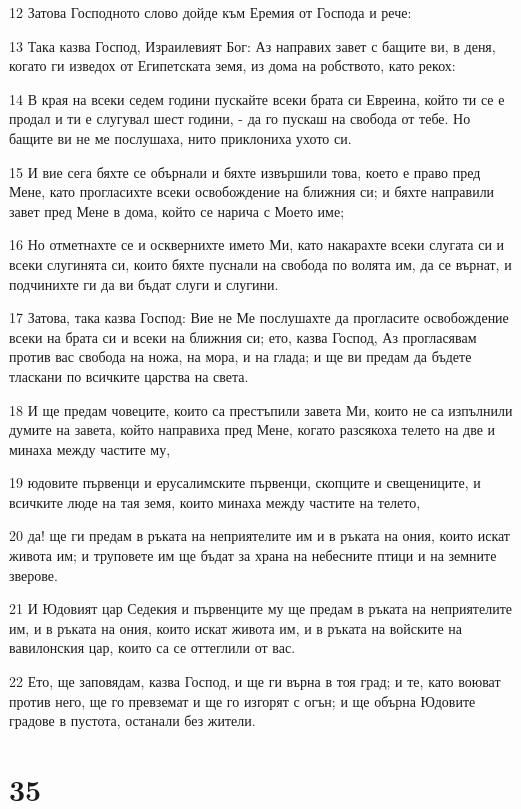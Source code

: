 \par 12 Затова Господното слово дойде към Еремия от Господа и рече:
\par 13 Така казва Господ, Израилевият Бог: Аз направих завет с бащите ви, в деня, когато ги изведох от Египетската земя, из дома на робството, като рекох:
\par 14 В края на всеки седем години пускайте всеки брата си Евреина, който ти се е продал и ти е слугувал шест години, - да го пускаш на свобода от тебе. Но бащите ви не ме послушаха, нито приклониха ухото си.
\par 15 И вие сега бяхте се обърнали и бяхте извършили това, което е право пред Мене, като прогласихте всеки освобождение на ближния си; и бяхте направили завет пред Мене в дома, който се нарича с Моето име;
\par 16 Но отметнахте се и осквернихте името Ми, като накарахте всеки слугата си и всеки слугинята си, които бяхте пуснали на свобода по волята им, да се върнат, и подчинихте ги да ви бъдат слуги и слугини.
\par 17 Затова, така казва Господ: Вие не Ме послушахте да прогласите освобождение всеки на брата си и всеки на ближния си; ето, казва Господ, Аз прогласявам против вас свобода на ножа, на мора, и на глада; и ще ви предам да бъдете тласкани по всичките царства на света.
\par 18 И ще предам човеците, които са престъпили завета Ми, които не са изпълнили думите на завета, който направиха пред Мене, когато разсякоха телето на две и минаха между частите му,
\par 19 юдовите първенци и ерусалимските първенци, скопците и свещениците, и всичките люде на тая земя, които минаха между частите на телето,
\par 20 да! ще ги предам в ръката на неприятелите им и в ръката на ония, които искат живота им; и труповете им ще бъдат за храна на небесните птици и на земните зверове.
\par 21 И Юдовият цар Седекия и първенците му ще предам в ръката на неприятелите им, и в ръката на ония, които искат живота им, и в ръката на войските на вавилонския цар, които са се оттеглили от вас.
\par 22 Ето, ще заповядам, казва Господ, и ще ги върна в тоя град; и те, като воюват против него, ще го превземат и ще го изгорят с огън; и ще обърна Юдовите градове в пустота, останали без жители.

\chapter{35}


